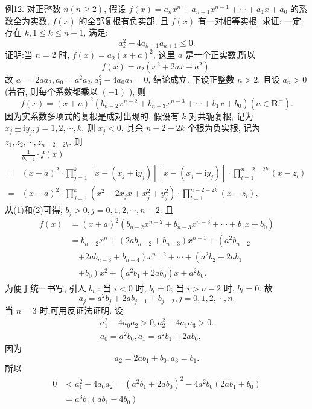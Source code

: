 例12. 对正整数 $n(n \geqslant 2)$, 假设 $f(x)=a_n x^n+a_{n-1} x^{n-1}+\cdots+a_1 x+a_0$ 的系数全为实数, $f(x)$ 的全部复根有负实部, 且 $f(x)$ 有一对相等实根.
求证: 一定存在 $k, 1 \leqslant k \leqslant n-1$, 满足:
$$
a_k^2-4 a_{k-1} a_{k+1} \leqslant 0 .
$$
证明:当 $n=2$ 时, $f(x)=a_2(x+a)^2$, 这里 $a$ 是一个正实数,所以
$$
f(x)=a_2\left(x^2+2 a x+a^2\right) .
$$
故 $a_1=2 a a_2, a_0=a^2 a_2, a_1^2-4 a_0 a_2=0$, 结论成立.
下设正整数 $n>2$, 且设 $a_n>0$ (若否, 则每个系数都乘以 $(-1)$ ), 则
$$
f(x)=(x+a)^2\left(b_{n-2} x^{n-2}+b_{n-3} x^{n-3}+\cdots+b_1 x+b_0\right)\left(a \in \mathbf{R}^{+}\right) . \label{(1)}
$$
因为实系数多项式的复根是成对出现的, 假设有 $k$ 对共轭复根, 记为 $x_j \pm \mathrm{i} y_j, j=1,2, \cdots, k$, 则 $x_j<0$. 其余 $n-2-2 k$ 个根为负实根, 记为 $z_1, z_2, \cdots, z_{n-2-2 k}$. 则
$$
\begin{aligned}
& \frac{1}{b_{n-2}} \cdot f(x) \\
= & (x+a)^2 \cdot \prod_{j=1}^k\left[x-\left(x_j+\mathrm{i} y_j\right)\right]\left[x-\left(x_j-\mathrm{i} y_j\right)\right] \cdot \prod_{l=1}^{n-2-2 k}\left(x-z_l\right) \\
= & (x+a)^2 \cdot \prod_{j=1}^k\left(x^2-2 x_j x+x_j^2+y_j^2\right) \cdot \prod_{l=1}^{n-2-2 k}\left(x-z_l\right),
\end{aligned} \label{(2)}
$$
从(1)和(2)可得, $b_j>0, j=0,1,2, \cdots, n-2$. 且
$$
\begin{aligned}
f(x) & =(x+a)^2\left(b_{n-2} x^{n-2}+b_{n-3} x^{n-3}+\cdots+b_1 x+b_0\right) \\
& =b_{n-2} x^n+\left(2 a b_{n-2}+b_{n-3}\right) x^{n-1}+\left(a^2 b_{n-2}\right.
\end{aligned}
$$
$$
\begin{aligned}
& \left.+2 a b_{n-3}+b_{n-4}\right) x^{n-2}+\cdots+\left(a^2 b_2+2 a b_1\right. \\
& \left.+b_0\right) x^2+\left(a^2 b_1+2 a b_0\right) x+a^2 b_0 .
\end{aligned}
$$
为便于统一书写, 引人 $b_i$ : 当 $i<0$ 时, $b_i=0$; 当 $i>n-2$ 时, $b_i=0$. 故
$$
a_j=a^2 b_j+2 a b_{j-1}+b_{j-2}, j=0,1,2, \cdots, n .
$$
当 $n=3$ 时,可用反证法证明.
设
$$
\begin{gathered}
a_1^2-4 a_0 a_2>0, a_2^2-4 a_1 a_3>0 . \\
a_0=a^2 b_0, a_1=a^2 b_1+2 a b_0,
\end{gathered}
$$
因为
$$
a_2=2 a b_1+b_0, a_3=b_1 .
$$
所以
$$
\begin{aligned}
0 & <a_1^2-4 a_0 a_2=\left(a^2 b_1+2 a b_0\right)^2-4 a^2 b_0\left(2 a b_1+b_0\right) \\
& =a^3 b_1\left(a b_1-4 b_0\right)
\end{aligned}
$$
